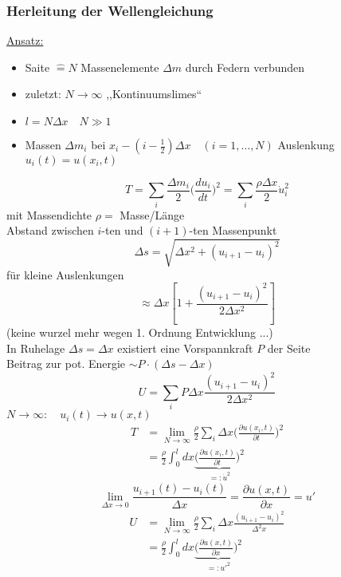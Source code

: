 \documentclass[titlepage,12pt,a4paper,ngerman]{report}
\newcommand{\ub}[1]{\underbrace{#1}}
\begin{document}
{\subsubsection{Herleitung der Wellengleichung}
\underline{Ansatz:}
\begin{itemize}
	\item Saite $ \widehat{=} N $ Massenelemente $ \Delta m $ durch Federn verbunden
	\item zuletzt: $ N \rightarrow \infty $ ,,Kontinuumslimes``
	\item $ l= N \Delta x \quad N \gg 1 $
	\item Massen $ \Delta m_i $ bei $ x_i - (i-\frac{1}{2}) \Delta x \quad (i=1,\dots, N) $ Auslenkung $ u_i(t) = u(x_i,t) $ 
\end{itemize}
\begin{equation*}
T = \sum_{i} \frac{\Delta m_i}{2} \bigg( \frac{du_i}{dt} \bigg) ^2 = \sum_i \frac{\rho \Delta x}{2} \dot{u}_i^2 \tag{1}
\end{equation*}
mit Massendichte $ \rho = $ Masse/Länge \\
Abstand zwischen $ i $-ten und $ (i+1) $-ten Massenpunkt
$$\Delta s = \sqrt{\Delta x^2 + (u_{i+1} - u_i)^2} $$
für kleine Auslenkungen
$$ \approx \Delta x [1 + \frac{(u_{i+1} - u_i)^2}{2 \Delta x^2}]$$
(keine wurzel mehr wegen 1. Ordnung Entwicklung ...)\\
In Ruhelage $ \Delta s = \Delta x $ existiert eine Vorspannkraft $ P $ der Seite\\
Beitrag zur pot. Energie $ \sim P \cdot (\Delta s - \Delta x) $
\begin{equation*}
U = \sum_i P \Delta x \frac{(u_{i+1} - u_i)^2}{2 \Delta x^2} \tag{2}
\end{equation*}
$ N \rightarrow \infty : \quad u_i(t) \rightarrow u(x,t) $
\begin{align*}
T &= \lim\limits_{N\rightarrow \infty} \frac{\rho}{2} \sum_i \Delta x \bigg( \frac{\partial u(x_i,t)}{\partial t} \bigg) ^2\\
&= \frac{\rho}{2} \int_{0}^{l} dx \ub{\bigg( \frac{\partial u(x_i,t)}{\partial t} \bigg) ^2}_{=: \dot{u}^2}
\end{align*}
$$ \lim_{\Delta x \to 0} \frac{u_{i+1}(t) - u_i(t)}{\Delta x} = \frac{\partial u(x,t)}{\partial x} = u'$$
\begin{align*}
U &= \lim\limits_{N\rightarrow \infty} \frac{\rho}{2} \sum_i \Delta x \frac{(u_{i+1} - u_i)^2}{\Delta^2 x}\\
&= \frac{\rho}{2} \int_{0}^{l} dx \ub{\bigg( \frac{\partial u(x,t)}{\partial x} \bigg) ^2}_{=: u'^2}
\end{align*}

}
\end{document}
